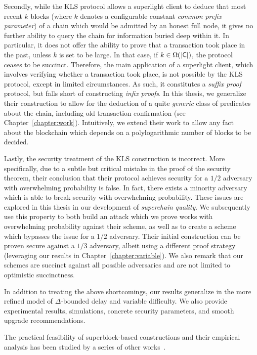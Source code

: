 Secondly, while the KLS protocol allows a superlight client to deduce that most
recent $k$ blocks (where $k$ denotes a configurable constant \emph{common prefix
parameter}) of a chain which would be admitted by an honest full node, it gives
no further ability to query the chain for information buried deep within it. In
particular, it does not offer the ability to prove that a transaction took place
in the past, unless $k$ is set to be large. In that case, if
$k \in \Omega(|\mathsf{C}|)$, the protocol ceases to be succinct. Therefore, the
main application of a superlight client, which involves verifying whether a
transaction took place, is not possible by the KLS protocol, except in limited
circumstances. As such, it constitutes a \emph{suffix proof} protocol, but falls
short of constructing \emph{infix proofs}. In this thesis, we generalize their
construction to allow for the deduction of a quite \emph{generic} class of
predicates about the chain, including old transaction confirmation (see
Chapter~\ref{chapter:work}). Intuitively,
we extend their work to allow any fact about the blockchain which depends on a
polylogarithmic number of blocks to be decided.

Lastly, the security treatment of the KLS construction is incorrect. More
specifically, due to a subtle but critical mistake in the proof of the security
theorem, their conclusion that their protocol achieves security for a $1/2$
adversary with overwhelming probability is false. In fact, there exists a
minority adversary which is able to break security with overwhelming
probability. These issues are explored in this thesis in our development of
\emph{superchain quality}. We subsequently use this property to both build an
attack which we prove works with overwhelming probability against their scheme,
as well as to create a scheme which bypasses the issue for a $1/2$ adversary.
Their initial construction can be proven secure against a $1/3$ adversary,
albeit using a different proof strategy (leveraging our results in
Chapter~\ref{chapter:variable}). We also remark that our schemes are succinct
against all possible adversaries and are not limited to optimistic succinctness.

In addition to treating the above shortcomings, our results generalize in the
more refined model of $\Delta$-bounded delay and variable difficulty. We also
provide experimental results, simulations, concrete security parameters, and
smooth upgrade recommendations.

The practical feasibility of superblock-based constructions and their empirical
analysis has been studied by a series of other
works~\cite{gtklocker,compactsuperblocks}.

